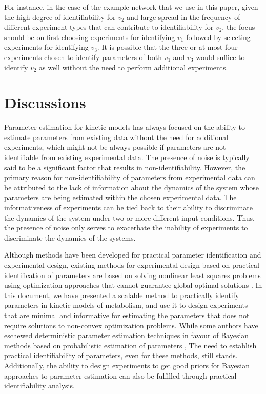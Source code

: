\documentclass[10pt]{article}
\begin{document}
For instance, in the case of the example network that we use in this paper, given the high degree of identifiability for $v_2$ and large spread in the frequency of different experiment types that can contribute to identifiability for $v_2$, the focus should be on first choosing experiments for identifying $v_1$ followed by selecting experiments for identifying $v_3$. It is possible that the three or at most four experiments chosen to identify parameters of both $v_1$ and $v_3$ would suffice to identify $v_2$ as well without the need to perform additional experiments.	

\section{Discussions}\label{sec:discussion}	
Parameter estimation for kinetic models has always focused on the ability to estimate parameters from existing data without the need for additional experiments, which might not be always possible if parameters are not identifiable from existing experimental data. The presence of noise is typically said to be a significant factor that results in non-identifiability. However, the primary reason for non-identifiability of parameters from experimental data can be attributed to the lack of information about the dynamics of the system whose parameters are being estimated within the chosen experimental data. The informativeness of experiments can be tied back to their ability to discriminate the dynamics of the system under two or more different input conditions. Thus, the presence of noise only serves to exacerbate the inability of experiments to discriminate the dynamics of the systems. 

Although methods have been developed for practical parameter identification and experimental design, existing methods for experimental design based on practical identification of parameters are based on solving nonlinear least squares problems using optimization approaches that cannot guarantee global optimal solutions \parencite{Raue2009a}. In this document, we have presented a scalable method to practically identify parameters in kinetic models of metabolism, and use it to design experiments that are minimal and informative for estimating the parameters that does not require solutions to non-convex optimization problems. While some authors have eschewed deterministic parameter estimation techniques in favour of Bayesian methods based on probabilistic estimation of parameters \parencite{Saa2016, Saa2016a}, The need to establish practical identifiability of parameters, even for these methods, still stands. Additionally, the ability to design experiments to get good priors for Bayesian approaches to parameter estimation can also be fulfilled through practical identifiability analysis.
\end{document}
